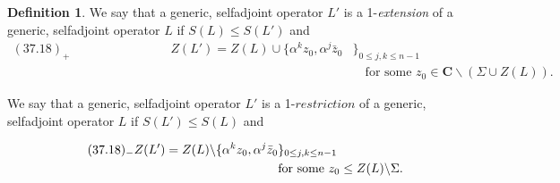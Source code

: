 \documentclass{surv-l}
\theoremstyle{plain}
\theoremstyle{definition}
\newtheorem{definition}[theorem]{Definition}
\numberwithin{equation}{chapter}
\begin{document}
\begin{definition}\label{def37.18} We say that a generic, selfadjoint operator $L'$ is a 1-\emph{extension} of a generic, selfadjoint operator $L$ if $S(L)\leq S(L')$ and
\renewcommand\theequation{37.18$_{+}$}
\begin{align*}
(37.18)_{+}\qquad\qquad\qquad\qquad Z(L')=Z(L)\cup\{\alpha^{k}z_{0},\alpha^{j}\bar{z}_{0}&\}_{0\leq j,k\leq n-1}\\
&\quad \text{for some }z_{0}\in \mathbf{C}\backslash (\Sigma\cup Z(L)).\nonumber
\end{align*}

We say that a generic, selfadjoint operator $L'$ is a 1-$restriction$ of a generic, selfadjoint operator $L$ if $S(L')\leq S(L)$ and

\begin{align*}
\tag*{$(37.18)_{-}$} Z(L')=Z(L)\backslash \{\alpha^{k}z_{0},\alpha^{j}\bar{z}_{0}&\}_{0\leq j,k\leq n-1}\\
&\text{for some }z_{0}\leq Z(L)\backslash \Sigma.
\end{align*}
 \end{definition}
\setcounter{theorem}{18}
\end{document}
